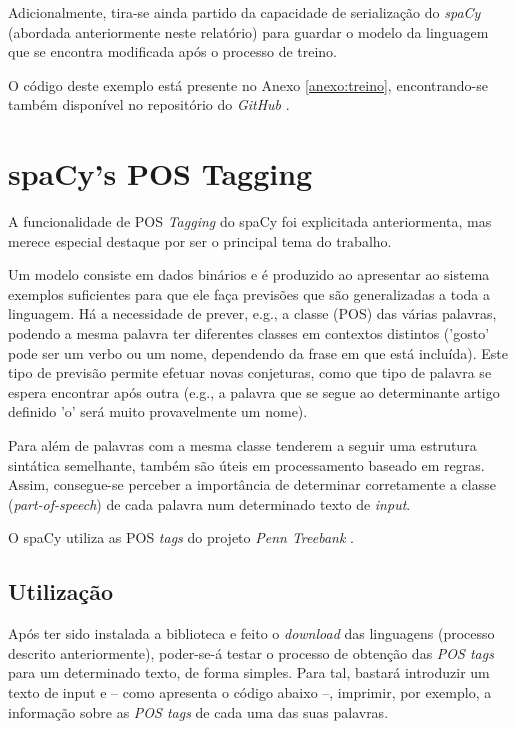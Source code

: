 \documentclass[12pt]{article}
\begin{document}
Adicionalmente, tira-se ainda partido da capacidade de serialização do \textit{spaCy} (abordada anteriormente neste relatório) para guardar o modelo da linguagem que se encontra modificada após o processo de treino.

O código deste exemplo está presente no Anexo \ref{anexo:treino}, encontrando-se também disponível no repositório do \textit{GitHub} \cite{spacy_example_explosion}.



\section{spaCy's POS Tagging} %

A funcionalidade de POS \textit{Tagging} do spaCy foi explicitada anteriormenta, mas merece especial destaque por ser o principal tema do trabalho.

Um modelo consiste em dados binários e é produzido ao apresentar ao sistema exemplos suficientes para que ele faça previsões que são generalizadas a toda a linguagem. Há a necessidade de prever, e.g., a classe (POS) das várias palavras, podendo a mesma palavra ter diferentes classes em contextos distintos ('gosto' pode ser um verbo ou um nome, dependendo da frase em que está incluída). Este tipo de previsão permite efetuar novas conjeturas, como que tipo de palavra se espera encontrar após outra (e.g., a palavra que se segue ao determinante artigo definido 'o' será muito provavelmente um nome).

Para além de palavras com a mesma classe tenderem a seguir uma estrutura sintática semelhante, também são úteis em processamento baseado em regras. Assim, consegue-se perceber a importância de determinar corretamente a classe (\textit{part-of-speech}) de cada palavra num determinado texto de \textit{input}.

O spaCy utiliza as POS \textit{tags} do projeto \textit{Penn Treebank} \cite{spacy_pos}.




\subsection{Utilização} %

Após ter sido instalada a biblioteca e feito o \textit{download} das linguagens (processo descrito anteriormente), poder-se-á testar o processo de obtenção das \textit{POS tags} para
um determinado texto, de forma simples. Para tal, bastará introduzir um texto de input e -- como apresenta o código abaixo --, imprimir, por exemplo, a informação sobre as
\textit{POS tags} de cada uma das suas palavras.
\end{document}
